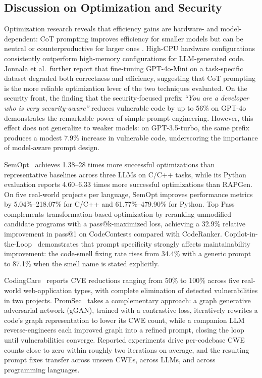 \documentclass[10pt,a4paper]{article}
\begin{document}
\subsection{Discussion on Optimization and Security}
Optimization research reveals that efficiency gains are hardware- and model-dependent: CoT prompting improves efficiency for smaller models but can be neutral or counterproductive for larger ones \cite{jonnala2025}. High-CPU hardware configurations consistently outperform high-memory configurations for LLM-generated code. Jonnala et al.\ further report that fine-tuning GPT-4o-Mini on a task-specific dataset degraded both correctness and efficiency, suggesting that CoT prompting is the more reliable optimization lever of the two techniques evaluated. On the security front, the finding that the security-focused prefix \textit{``You are a developer who is very security-aware''} reduces vulnerable code by up to 56\% on GPT-4o \cite{bruni2025} demonstrates the remarkable power of simple prompt engineering. However, this effect does not generalize to weaker models: on GPT-3.5-turbo, the same prefix produces a modest 7.9\% increase in vulnerable code, underscoring the importance of model-aware prompt design.

SemOpt~\cite{zhao2025semopt} achieves 1.38--28 times more successful optimizations than representative baselines across three LLMs on C/C++ tasks, while its Python evaluation reports 4.60--6.33 times more successful optimizations than RAPGen. On five real-world projects per language, SemOpt improves performance metrics by 5.04\%--218.07\% for C/C++ and 61.77\%--479.90\% for Python. Top Pass~\cite{lyu2025toppass} complements transformation-based optimization by reranking unmodified candidate programs with a pass@k-maximized loss, achieving a 32.9\% relative improvement in pass@1 on CodeContests compared with CodeRanker. Copilot-in-the-Loop~\cite{zhang2024copilot} demonstrates that prompt specificity strongly affects maintainability improvement: the code-smell fixing rate rises from 34.4\% with a generic prompt to 87.1\% when the smell name is stated explicitly.

CodingCare~\cite{ding2025codingcare} reports CVE reductions ranging from 50\% to 100\% across five real-world web-application types, with complete elimination of detected vulnerabilities in two projects. PromSec~\cite{nazzal2024promsec} takes a complementary approach: a graph generative adversarial network (gGAN), trained with a contrastive loss, iteratively rewrites a code's graph representation to lower its CWE count, while a companion LLM reverse-engineers each improved graph into a refined prompt, closing the loop until vulnerabilities converge. Reported experiments drive per-codebase CWE counts close to zero within roughly two iterations on average, and the resulting prompt fixes transfer across unseen CWEs, across LLMs, and across programming languages.
\end{document}
